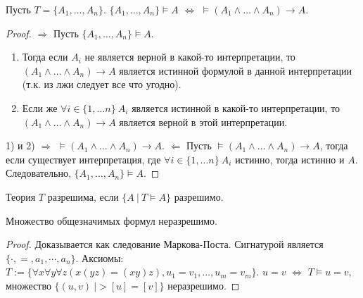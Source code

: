 \begin{lemma}
  Пусть $T = \{A_1, \dots, A_n\}$. $\{A_1, \dots, A_n\} \vDash A$ $\Leftrightarrow$ $\vDash (A_1 \wedge \dots \wedge A_n) \to A$.
  \begin{proof}
    $\Rightarrow$ Пусть $\{A_1, \dots, A_n\} \vDash A$. 
    \begin{enumerate}
      \item Тогда если $A_i$ не является верной в какой-то  интерпретации, то $(A_1 \wedge \dots \wedge A_n) \to A$ является истинной формулой в данной интерпретации (т.к. из лжи следует все что угодно).
      \item Если же $\forall i \in \{1,\dots n\} \> A_i$ является истинной в какой-то интерпретации, то $(A_1 \wedge \dots \wedge A_n) \to A$ является верной в этой интерпретации.
    \end{enumerate}
    1) и 2) $\Rightarrow$ $\vDash (A_1 \wedge \dots \wedge A_n) \to A$. \newline
    $\Leftarrow$ Пусть $\vDash (A_1 \wedge \dots \wedge A_n) \to A$, тогда если существует интерпретация, где $\forall i \in \{1,\dots n\} \> A_i$ истинно, тогда истинно и $A$. Следовательно, $\{A_1, \dots, A_n\} \vDash A$.
  \end{proof}
\end{lemma}

\begin{definition}
  Теория $T$ разрешима, если $\{A \> | \> T \vDash A\}$ разрешимо.
\end{definition}




\begin{theorem}
  Множество общезначимых формул неразрешимо.
  \begin{proof}
    Доказывается как следование Маркова-Поста. \newline
    Сигнатурой является $\{\cdot, =, a_1, \cdots, a_n\}$. \newline
    Аксиомы: $T := \{\forall x \forall y \forall z (x(yz) = (xy)z), u_1 = v_1, \dots, u_m = v_m\}$. \newline
    $u = v$ $\Leftrightarrow$ $T \vDash u = v$, множество $\{(u,v) \> |> [u] = [v]\}$ неразрешимо.
  \end{proof}
\end{theorem}